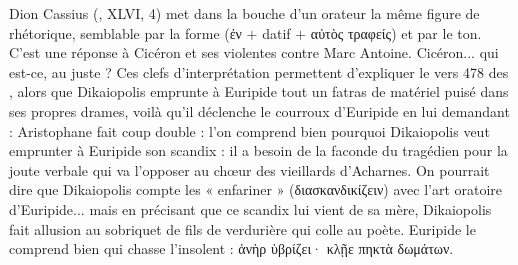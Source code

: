 {Dion Cassius (, XLVI, 4) met dans la bouche d'un orateur la même figure de rhétorique, semblable par la forme (ἐν $+$ datif $+$ αὐτὸς τραφείς) et par le ton. C'est une réponse à Cicéron et ses violentes  contre Marc Antoine. Cicéron... qui est-ce, au juste ?
Ces clefs d'interprétation permettent d'expliquer le vers 478 des , alors que Dikaiopolis emprunte à Euripide tout un fatras de matériel puisé dans ses propres drames, voilà qu'il déclenche le courroux d'Euripide en lui demandant :
Aristophane fait coup double : l'on comprend bien pourquoi Dikaiopolis veut emprunter à Euripide son scandix : il a besoin de la faconde du tragédien pour la joute verbale qui va l'opposer au chœur des vieillards d'Acharnes. 
On pourrait dire que Dikaiopolis compte les « enfariner » (διασκανδικίζειν) avec l'art oratoire d'Euripide... mais en précisant que ce scandix lui vient de sa mère, Dikaiopolis fait allusion au sobriquet de fils de verdurière qui colle au poète.
Euripide le comprend bien qui chasse l'insolent : ἁνὴρ ὑβρίζει· κλῇε πηκτὰ δωμάτων.\\

}
